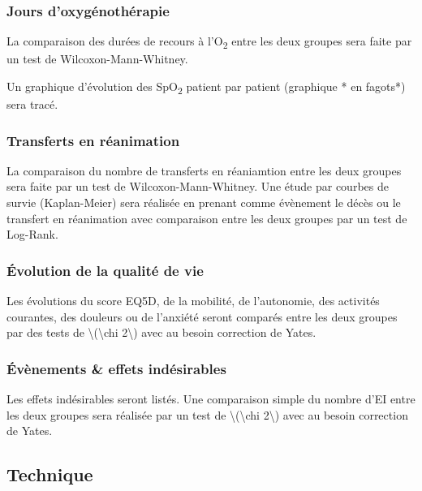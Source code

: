 \hypertarget{jours-doxyguxe9nothuxe9rapie}{%
\subsubsection{Jours
d'oxygénothérapie}\label{jours-doxyguxe9nothuxe9rapie}}

La comparaison des durées de recours à l'O\textsubscript{2} entre les
deux groupes sera faite par un test de Wilcoxon-Mann-Whitney.

Un graphique d'évolution des SpO\textsubscript{2} patient par patient
(graphique * en fagots*) sera tracé.

\hypertarget{transferts-en-ruxe9animation}{%
\subsubsection{Transferts en
réanimation}\label{transferts-en-ruxe9animation}}

La comparaison du nombre de transferts en réaniamtion entre les deux
groupes sera faite par un test de Wilcoxon-Mann-Whitney. Une étude par
courbes de survie (Kaplan-Meier) sera réalisée en prenant comme
évènement le décès ou le transfert en réanimation avec comparaison entre
les deux groupes par un test de Log-Rank.

\hypertarget{uxe9volution-de-la-qualituxe9-de-vie}{%
\subsubsection{Évolution de la qualité de
vie}\label{uxe9volution-de-la-qualituxe9-de-vie}}

Les évolutions du score EQ5D, de la mobilité, de l'autonomie, des
activités courantes, des douleurs ou de l'anxiété seront comparés entre
les deux groupes par des tests de {\textbackslash(\textbackslash chi
2\textbackslash)} avec au besoin correction de Yates.

\hypertarget{uxe9vuxe8nements-effets-induxe9sirables}{%
\subsubsection{Évènements \& effets
indésirables}\label{uxe9vuxe8nements-effets-induxe9sirables}}

Les effets indésirables seront listés. Une comparaison simple du nombre
d'EI entre les deux groupes sera réalisée par un test de
{\textbackslash(\textbackslash chi 2\textbackslash)} avec au besoin
correction de Yates.

\hypertarget{technique}{%
\subsection{Technique}\label{technique}}

